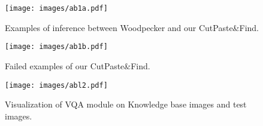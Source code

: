 \appendix
\onecolumn

\begin{figure}[t]
    \centering
    \texttt{[image: images/ab1a.pdf]}
    \caption{Examples of inference between Woodpecker and our CutPaste\&Find.}
    \label{fig:ab1a}
\end{figure}

\begin{figure}[t]
    \centering
    \texttt{[image: images/ab1b.pdf]}
    \caption{Failed examples of our CutPaste\&Find.}
    \label{fig:ab1b}
\end{figure}

\begin{figure}[t]
    \centering
    \texttt{[image: images/abl2.pdf]}
    \caption{Visualization of VQA module on Knowledge base images and test images.}
    \label{fig:ab2}
\end{figure}


